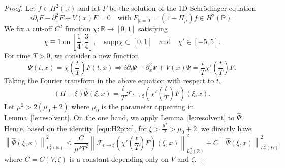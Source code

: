 \documentclass[a4paper,reqno]{amsart}
\theoremstyle{definition}
\numberwithin{equation}{section}
\newcommand{\R}{\mathbb{R}}
\def \R {{\mathbb{R} }}
\begin{document}
\begin{proof}
Let $f\in H^{2}(\R)$ and let $F$ be the solution of the 1D Schr\"odinger equation
\begin{equation*}
i\partial_{t}F-\partial_{x}^{2}F+V(x)F=0\quad \mbox{with}\ F_{|t=0}=(1-\Pi_{\mu})f\in H^{2}(\R).
\end{equation*}
We fix a cut-off $C^{2}$ function $\chi:\R\to [0,1]$ satisfying
\begin{equation*}
    \chi\equiv 1 \ \mbox{on}\ \left[\frac{1}{4},\frac{3}{4}\right],\quad \mbox{supp}\chi\subset[0,1]
    \quad \mbox{and}\quad \chi'\in [-5,5].
\end{equation*}
For time $T>0$, we consider a new function
\begin{equation*}
    \Psi(t,x)=\chi\left(\frac{t}{T}\right)F(t,x)
    \Longrightarrow i\partial_{t}\Psi-\partial_{x}^{2}\Psi+V(x)\Psi=\frac{i}{T}\chi'\left(\frac{t}{T}\right)F.
    \end{equation*}
Taking the Fourier transform in the above equation with respect to $t$,
\begin{equation}\label{equ:H2pixi}
(H- \xi)\widehat{\Psi}(\xi,x)=\frac{i}{T}\mathcal{F}_{t\to \xi}\left({\chi'\left(\frac{t}{T}\right)F}\right)(\xi,x).
\end{equation}
Let $\mu^2>2(\mu_{0}+2)$ where $\mu_{0}$ is the parameter appearing in Lemma~\ref{le:resolvent}. On the one hand, we apply Lemma~\ref{le:resolvent} to $\widehat{\Psi}$. Hence, based on the identity~\eqref{equ:H2pixi}, for $\xi>\frac{\mu^2}{2}>\mu_{0}+2$, we directly have
\begin{equation}\label{est:Psi1}
    \left\|\widehat{\Psi}(\xi,x)\right\|^{2}_{L_{x}^{2}(\R)}\le \frac{C}{\mu^2T^2}\left\|\mathcal{F}_{t\to \xi}\left({\chi'\left(\frac{t}{T}\right)F}\right)(\xi,x)\right\|_{L_{x}^{2}(\R)}^{2}+C\left\|\widehat{\Psi}(\xi,x)\right\|^{2}_{L_{x}^{2}(\Omega)},
    \end{equation}
    where $C=C(V,\zeta)$ is a constant depending only on $V$ and $\zeta$.


\end{proof}
\end{document}
